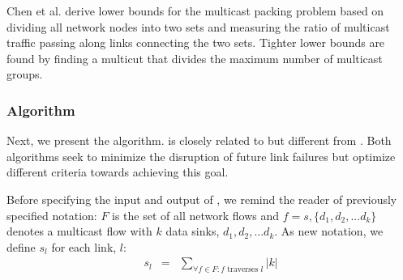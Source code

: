 Chen et al. \cite{Chen00} derive lower bounds for the multicast packing problem based on dividing all network nodes into two sets and measuring the ratio of 
multicast traffic passing along links connecting the two sets.  Tighter lower bounds are found by finding a multicut that divides the maximum number of multicast groups.  





\subsubsection{\md Algorithm}
\label{subsubsec:md-alg}

Next, we present the \md algorithm. \md is closely related to but different from \mfs.  Both algorithms seek to minimize the disruption of future link failures but optimize different
criteria towards achieving this goal.  

Before specifying the input and output of \mds, we remind the reader of previously specified notation: $F$ is the set of all network flows and 
$f = s,\{d_1,d_2, ... d_k\}$ denotes a multicast flow with $k$ data sinks, $d_1,d_2, ... d_k$.  As new notation, we define $s_l$ for each link, $l$: %
\begin{eqnarray}
s_l &=& \sum_{\forall f \in F : f \text{ traverses } l} |k|
\end{eqnarray}

